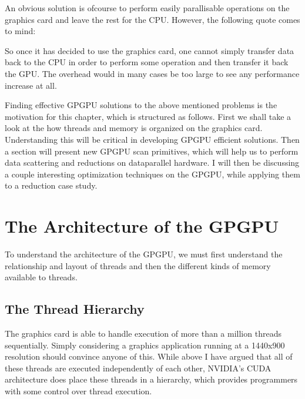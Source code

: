 
An obvious solution is ofcourse to perform easily parallisable
operations on the graphics card and leave the rest for the
CPU. However, the following quote comes to mind:


So once it has decided to use the graphics card, one cannot simply
transfer data back to the CPU in order to perform some operation and
then transfer it back the GPU. The overhead would in many cases be too
large to see any performance increase at all.




Finding effective GPGPU solutions to the above mentioned problems is
the motivation for this chapter, which is structured as follows.
First we shall take a look at the how threads and memory is organized
on the graphics card. Understanding this will be critical in
developing GPGPU efficient solutions. Then a section will present new
GPGPU scan primitives, which will help us to perform data scattering
and reductions on dataparallel hardware. I will then be discussing a
couple interesting optimization techniques on the GPGPU, while
applying them to a reduction case study.



\section{The Architecture of the GPGPU}

To understand the architecture of the GPGPU, we must first understand the
relationship and layout of threads and then the different kinds of
memory available to threads.

\subsection{The Thread Hierarchy}


The graphics card is able to handle execution of more than a million
threads sequentially. Simply considering a graphics application
running at a 1440x900 resolution should convince anyone of this. While
above I have argued that all of these threads are executed
independently of each other, NVIDIA's CUDA architecture does place
these threads in a hierarchy, which provides programmers with some
control over thread execution.

